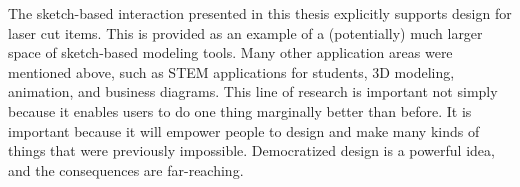 The sketch-based interaction presented in this thesis explicitly
supports design for laser cut items. This is provided as an example of
a (potentially) much larger space of sketch-based modeling tools. Many
other application areas were mentioned above, such as STEM
applications for students, 3D modeling, animation, and business
diagrams. This line of research is important not simply because it
enables users to do one thing marginally better than before. It is
important because it will empower people to design and make many kinds
of things that were previously impossible. Democratized design is a
powerful idea, and the consequences are far-reaching.


